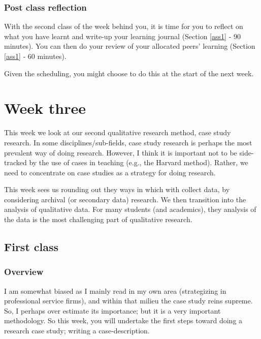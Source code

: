 \documentclass[]{book}
\theoremstyle{definition}
\theoremstyle{definition}
\theoremstyle{definition}
\theoremstyle{remark}
\begin{document}
\hypertarget{post-class-reflection-3}{%
\subsection*{Post class reflection}\label{post-class-reflection-3}}

With the second class of the week behind you, it is time for you to
reflect on what you have learnt and write-up your learning journal
(Section \ref{ass1} ‐ 90 minutes). You can then do your review of your
allocated peers' learning (Section \ref{ass1} ‐ 60 minutes).

Given the scheduling, you might choose to do this at the start of the
next week.

\hypertarget{w3-details}{%
\chapter{Week three}\label{w3-details}}

This week we look at our second qualitative research method, case study
research. In some disciplines/sub-fields, case study research is perhaps
the most prevalent way of doing research. However, I think it is
important not to be side-tracked by the use of cases in teaching (e.g.,
the Harvard method). Rather, we need to concentrate on case studies as a
strategy for doing research.

This week sees us rounding out they ways in which with collect data, by
considering archival (or secondary data) research. We then transition
into the analysis of qualitative data. For many students (and
academics), they analysis of the data is the most challenging part of
qualitative research.

\hypertarget{first-class-2}{%
\section*{First class}\label{first-class-2}}

\hypertarget{overview-4}{%
\subsection*{Overview}\label{overview-4}}

I am somewhat biased as I mainly read in my own area (strategizing in
professional service firms), and within that milieu the case study reins
supreme. So, I perhaps over estimate its importance; but it is a very
important methodology. So this week, you will undertake the first steps
toward doing a research case study; writing a case-description.
\end{document}
